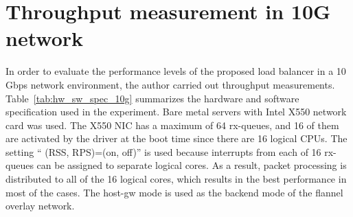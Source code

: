 

\section{Throughput measurement in 10G network}

In order to evaluate the performance levels of the proposed load balancer in a 10 Gbps network environment, the author carried out throughput measurements.
Table~\ref{tab:hw_sw_spec_10g} summarizes the hardware and software specification used in the experiment.
Bare metal servers with Intel X550 network card was used.
The X550 NIC has a maximum of 64 rx-queues, and 16 of them are activated by the driver at the boot time since there are 16 logical CPUs.
The setting \enquote{ (RSS, RPS)=(on, off)} is used because interrupts from each of 16 rx-queues can be assigned to separate logical cores.
As a result, packet processing is distributed to all of the 16 logical cores, which results in the best performance in most of the cases.
The host-gw mode is used as the backend mode of the flannel overlay network.

